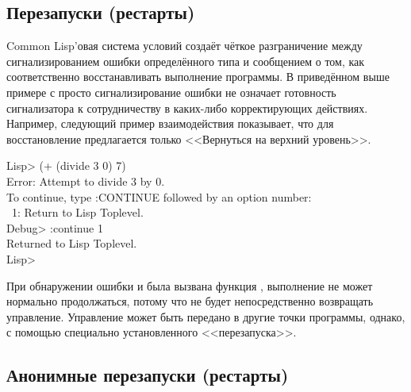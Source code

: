 \subsection{Перезапуски (рестарты)}
\label{RESTARTS}
Common Lisp'овая система условий создаёт чёткое разграничение между
сигнализированием ошибки определённого типа и сообщением о том, как
соответственно восстанавливать выполнение программы. В приведённом выше примере
с  просто сигнализирование ошибки не означает готовность
сигнализатора к сотрудничеству в каких-либо корректирующих действиях. Например, 
следующий пример взаимодействия показывает, что для восстановление предлагается
только <<Вернуться на верхний уровень>>.
\begin{lisp}
Lisp> (+ (divide 3 0) 7) \\
Error: Attempt to divide 3 by 0. \\
To continue, type :CONTINUE followed by an option number: \\
~1: Return to Lisp Toplevel. \\
Debug> :continue 1 \\
Returned to Lisp Toplevel. \\
Lisp>
\end{lisp}
При обнаружении ошибки и была вызвана функция , выполнение не может
нормально продолжаться, потому что  не будет непосредственно
возвращать управление. Управление может быть передано в другие точки программы,
однако, с помощью специально установленного <<перезапуска>>.

\subsection{Анонимные перезапуски (рестарты)}

